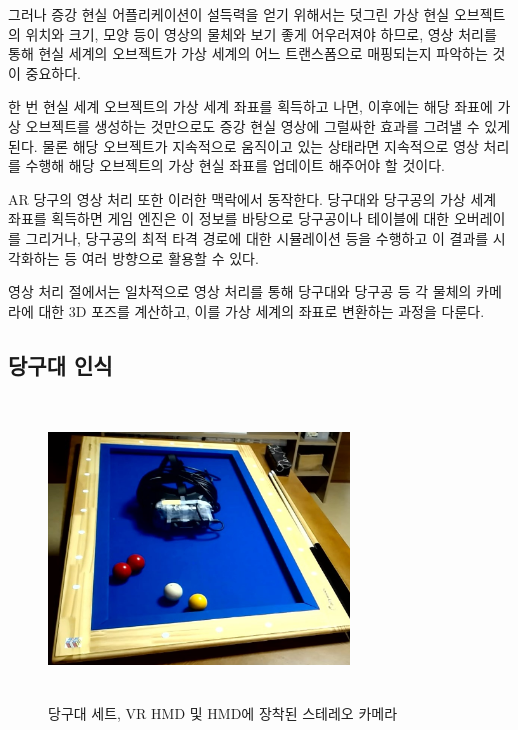 \documentclass[11pt]{oblivoir}
\begin{document}
    그러나 증강 현실 어플리케이션이 설득력을 얻기 위해서는 덧그린 가상 현실 오브젝트의 위치와 크기, 모양 등이 영상의 물체와 보기 좋게 어우러져야 하므로, 영상 처리를 통해 현실 세계의 오브젝트가 가상 세계의 어느 트랜스폼으로 매핑되는지 파악하는 것이 중요하다.

    한 번 현실 세계 오브젝트의 가상 세계 좌표를 획득하고 나면, 이후에는 해당 좌표에 가상 오브젝트를 생성하는 것만으로도 증강 현실 영상에 그럴싸한 효과를 그려낼 수 있게 된다. 물론 해당 오브젝트가 지속적으로 움직이고 있는 상태라면 지속적으로 영상 처리를 수행해 해당 오브젝트의 가상 현실 좌표를 업데이트 해주어야 할 것이다.

    AR 당구의 영상 처리 또한 이러한 맥락에서 동작한다. 당구대와 당구공의 가상 세계 좌표를 획득하면 게임 엔진은 이 정보를 바탕으로 당구공이나 테이블에 대한 오버레이를 그리거나, 당구공의 최적 타격 경로에 대한 시뮬레이션 등을 수행하고 이 결과를 시각화하는 등 여러 방향으로 활용할 수 있다.

    영상 처리 절에서는 일차적으로 영상 처리를 통해 당구대와 당구공 등 각 물체의 카메라에 대한 3D 포즈를 계산하고, 이를 가상 세계의 좌표로 변환하는 과정을 다룬다.

\subsection{당구대 인식}

    \label{section;imgproc;table}
    \begin{figure}[ht]
        \begin{center}
            \includegraphics[width=8cm, height=8cm, keepaspectratio]{img/billiards-table.png}
        \end{center}
        \caption[Caption for LOF]{당구대 세트, VR HMD 및 HMD에 장착된 스테레오 카메라\footnotemark}
        \label{fig;pool-table}
    \end{figure}
\end{document}
